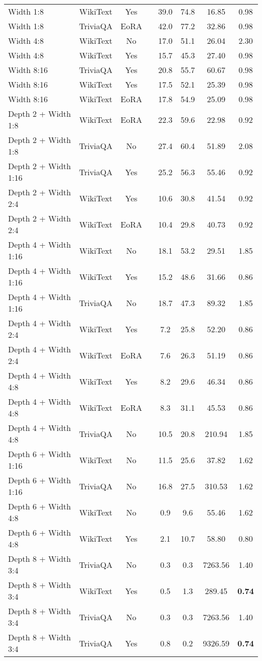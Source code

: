 {\begin{table}[htbp]
\begin{tabular}{lcclcccc}
Width 1:8 & WikiText & Yes & & 39.0 & 74.8 & 16.85 & 0.98 \\
Width 1:8 & TriviaQA & EoRA & & 42.0 & 77.2 & 32.86 & 0.98 \\
Width 4:8 & WikiText & No & & 17.0 & 51.1 & 26.04 & 2.30 \\
Width 4:8 & WikiText & Yes & & 15.7 & 45.3 & 27.40 & 0.98 \\
Width 8:16 & TriviaQA & Yes & & 20.8 & 55.7 & 60.67 & 0.98 \\
Width 8:16 & WikiText & Yes & & 17.5 & 52.1 & 25.39 & 0.98 \\
Width 8:16 & WikiText & EoRA & & 17.8 & 54.9 & 25.09 & 0.98 \\
Depth 2 + Width 1:8 & WikiText & EoRA & & 22.3 & 59.6 & 22.98 & 0.92 \\
Depth 2 + Width 1:8 & TriviaQA & No & & 27.4 & 60.4 & 51.89 & 2.08 \\
Depth 2 + Width 1:16 & TriviaQA & Yes & & 25.2 & 56.3 & 55.46 & 0.92 \\
Depth 2 + Width 2:4 & WikiText & Yes & & 10.6 & 30.8 & 41.54 & 0.92 \\
Depth 2 + Width 2:4 & WikiText & EoRA & & 10.4 & 29.8 & 40.73 & 0.92 \\
Depth 4 + Width 1:16 & WikiText & No & & 18.1 & 53.2 & 29.51 & 1.85 \\
Depth 4 + Width 1:16 & WikiText & Yes & & 15.2 & 48.6 & 31.66 & 0.86 \\
Depth 4 + Width 1:16 & TriviaQA & No & & 18.7 & 47.3 & 89.32 & 1.85 \\
Depth 4 + Width 2:4 & WikiText & Yes & & 7.2 & 25.8 & 52.20 & 0.86 \\
Depth 4 + Width 2:4 & WikiText & EoRA & & 7.6 & 26.3 & 51.19 & 0.86 \\
Depth 4 + Width 4:8 & WikiText & Yes & & 8.2 & 29.6 & 46.34 & 0.86 \\
Depth 4 + Width 4:8 & WikiText & EoRA & & 8.3 & 31.1 & 45.53 & 0.86 \\
Depth 4 + Width 4:8 & TriviaQA & No & & 10.5 & 20.8 & 210.94 & 1.85 \\
Depth 6 + Width 1:16 & WikiText & No & & 11.5 & 25.6 & 37.82 & 1.62 \\
Depth 6 + Width 1:16 & TriviaQA & No & & 16.8 & 27.5 & 310.53 & 1.62 \\
Depth 6 + Width 4:8 & WikiText & No & & 0.9 & 9.6 & 55.46 & 1.62 \\
Depth 6 + Width 4:8 & WikiText & Yes & & 2.1 & 10.7 & 58.80 & 0.80 \\
Depth 8 + Width 3:4 & TriviaQA & No & & 0.3 & 0.3 & 7263.56 & 1.40 \\
Depth 8 + Width 3:4 & WikiText & Yes & & 0.5 & 1.3 & 289.45 & \textbf{0.74} \\
Depth 8 + Width 3:4 & TriviaQA & No & & 0.3 & 0.3 & 7263.56 & 1.40 \\
Depth 8 + Width 3:4 & TriviaQA & Yes & & 0.8 & 0.2 & 9326.59 & \textbf{0.74} \\
\hline
\end{tabular}
\end{table}
}

